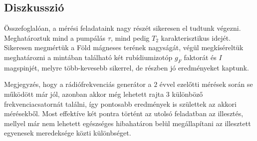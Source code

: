 \begin{multicols}{2}
\section{Diszkusszió}
Összefoglalóan, a mérési feladataink nagy részét sikeresen el tudtunk végezni. Meghatároztuk mind a pumpálás $\tau$, mind pedig $T_{2}$ karakterisztikus idejét. Sikeresen megmértük a Föld mágneses terének nagyságát, végül megkíséreltük meghatározni a mintában található két rubídiumizotóp $g_{F}$ faktorát és $I$ magspinjét, melyre több-kevesebb sikerrel, de részben jó eredményeket kaptunk. \par
Megjegyzés, hogy a rádiófrekvenciás generátor a $2$ évvel ezelőtti mérések során se működött már jól, azonban akkor még lehetett rajta $3$ különböző frekvenciacsatornát találni, így pontosabb eredmények is születtek az akkori mérésekből. Most effektíve két pontra történt az utolsó feladatban az illesztés, mellyel már nem lehetett egészséges hibahatáron belül megállapítani az illesztett egyenesek meredeksége közti különbséget.

\end{multicols}